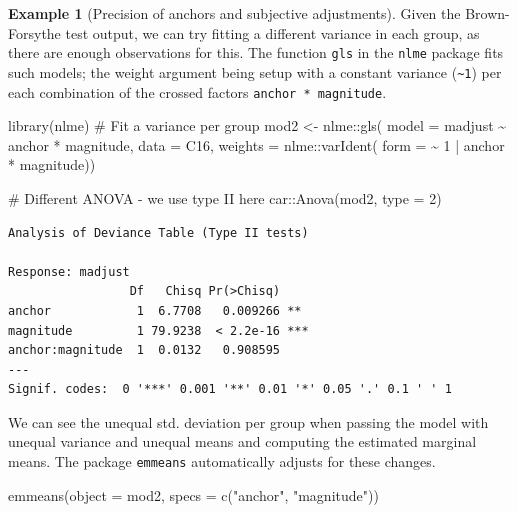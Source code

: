 \documentclass[
  11pt,
  letterpaper,
]{scrbook}
\newenvironment{Shaded}{\begin{snugshade}}{\end{snugshade}}
\newcommand{\AttributeTok}[1]{\textcolor[rgb]{0.40,0.45,0.13}{#1}}
\newcommand{\CommentTok}[1]{\textcolor[rgb]{0.37,0.37,0.37}{#1}}
\newcommand{\DecValTok}[1]{\textcolor[rgb]{0.68,0.00,0.00}{#1}}
\newcommand{\FunctionTok}[1]{\textcolor[rgb]{0.28,0.35,0.67}{#1}}
\newcommand{\NormalTok}[1]{\textcolor[rgb]{0.00,0.23,0.31}{#1}}
\newcommand{\OtherTok}[1]{\textcolor[rgb]{0.00,0.23,0.31}{#1}}
\newcommand{\SpecialCharTok}[1]{\textcolor[rgb]{0.37,0.37,0.37}{#1}}
\newcommand{\StringTok}[1]{\textcolor[rgb]{0.13,0.47,0.30}{#1}}
\theoremstyle{definition}
\newtheorem{example}{Example}[chapter]
\theoremstyle{definition}
\theoremstyle{remark}
\begin{document}
\begin{example}[Precision of anchors and subjective
adjustments]
Given the Brown-Forsythe test output, we can try fitting a different
variance in each group, as there are enough observations for this. The
function \texttt{gls} in the \texttt{nlme} package fits such models; the
weight argument being setup with a constant variance
(\texttt{\textasciitilde{}1}) per each combination of the crossed
factors \texttt{anchor\ *\ magnitude}.

\begin{Shaded}
\begin{Highlighting}[]
\FunctionTok{library}\NormalTok{(nlme)}
\CommentTok{\# Fit a variance per group}
\NormalTok{mod2 }\OtherTok{\textless{}{-}}\NormalTok{ nlme}\SpecialCharTok{::}\FunctionTok{gls}\NormalTok{(}
  \AttributeTok{model =}\NormalTok{ madjust }\SpecialCharTok{\textasciitilde{}}\NormalTok{ anchor }\SpecialCharTok{*}\NormalTok{ magnitude,}
  \AttributeTok{data =}\NormalTok{ C16,}
  \AttributeTok{weights =}\NormalTok{ nlme}\SpecialCharTok{::}\FunctionTok{varIdent}\NormalTok{(}
    \AttributeTok{form =} \SpecialCharTok{\textasciitilde{}} \DecValTok{1} \SpecialCharTok{|}\NormalTok{ anchor }\SpecialCharTok{*}\NormalTok{ magnitude))}

\CommentTok{\# Different ANOVA {-} we use type II here}
\NormalTok{car}\SpecialCharTok{::}\FunctionTok{Anova}\NormalTok{(mod2, }\AttributeTok{type =} \DecValTok{2}\NormalTok{)}
\end{Highlighting}
\end{Shaded}

\begin{verbatim}
Analysis of Deviance Table (Type II tests)

Response: madjust
                 Df   Chisq Pr(>Chisq)    
anchor            1  6.7708   0.009266 ** 
magnitude         1 79.9238  < 2.2e-16 ***
anchor:magnitude  1  0.0132   0.908595    
---
Signif. codes:  0 '***' 0.001 '**' 0.01 '*' 0.05 '.' 0.1 ' ' 1
\end{verbatim}

We can see the unequal std. deviation per group when passing the model
with unequal variance and unequal means and computing the estimated
marginal means. The package \texttt{emmeans} automatically adjusts for
these changes.

\begin{Shaded}
\begin{Highlighting}[]
\FunctionTok{emmeans}\NormalTok{(}\AttributeTok{object =}\NormalTok{ mod2, }
        \AttributeTok{specs =} \FunctionTok{c}\NormalTok{(}\StringTok{"anchor"}\NormalTok{, }\StringTok{"magnitude"}\NormalTok{))}
\end{Highlighting}
\end{Shaded}


\end{example}
\end{document}

